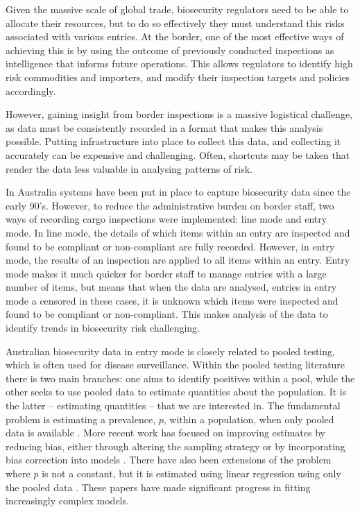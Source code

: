 \documentclass{article}
\begin{document}
Given the massive scale of global trade, biosecurity regulators need to be able to allocate their resources, but to do so effectively they must understand this risks associated with various entries. At the border, one of the most effective ways of achieving this is by using the outcome of previously conducted inspections as intelligence that informs future operations. This allows regulators to identify high risk commodities and importers, and modify their inspection targets and policies accordingly.

However, gaining insight from border inspections is a massive logistical challenge, as data must be consistently recorded in a format that makes this analysis possible. Putting infrastructure into place to collect this data, and collecting it accurately can be expensive and challenging. Often, shortcuts may be taken that render the data less valuable in analysing patterns of risk.

In Australia systems have been put in place to capture biosecurity data since the early 90's. However, to reduce the administrative burden on border staff, two ways of recording cargo inspections were implemented: line mode and entry mode. In line mode, the details of which items within an entry are inspected and found to be compliant or non-compliant are fully recorded. However, in entry mode, the results of an inspection are applied to all items within an entry. Entry mode makes it much quicker for border staff to manage entries with a large number of items, but means that when the data are analysed, entries in entry mode a censored \textemdash{} in these cases, it is unknown which items were inspected and found to be compliant or non-compliant. This makes analysis of the data to identify trends in biosecurity risk challenging.

Australian biosecurity data in entry mode is closely related to pooled testing, which is often used for disease surveillance. Within the pooled testing literature there is two main branches: one aims to identify positives within a pool, while the other seeks to use pooled data to estimate quantities about the population. It is the latter -- estimating quantities -- that we are interested in. The fundamental problem is estimating a prevalence, \(p\), within a population, when only pooled data is available \citep{thompson_estimation_1962}. More recent work has focused on improving estimates by reducing bias, either through altering the sampling strategy \citep{schaarschmidt_experimental_2007,hepworth_debiased_2009} or by incorporating bias correction into models  \citep{hepworth_bias_2017,hepworth_bias_2021}. There have also been extensions of the problem where \(p\) is not a constant, but it is estimated using linear regression using only the pooled data \citep{delaigle_nonparametric_2015, chatterjee_regression_2020, mcmahan_bayesian_2017, liu_generalized_2020}. These papers have made significant progress in fitting increasingly complex models.
\end{document}
